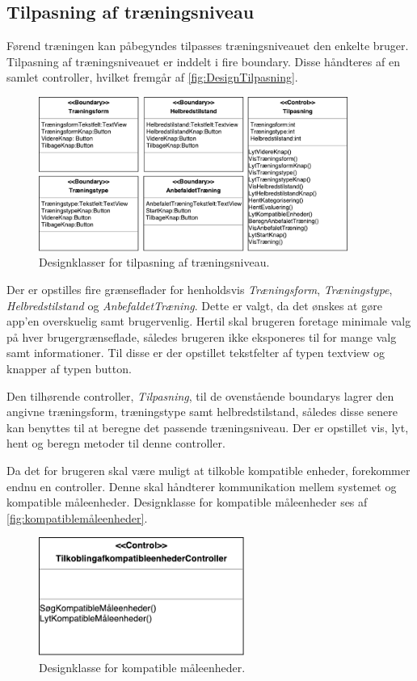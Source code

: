 \subsection*{Tilpasning af træningsniveau}
Førend træningen kan påbegyndes tilpasses træningsniveauet den enkelte bruger. Tilpasning af træningsniveauet er inddelt i fire boundary. Disse håndteres af en samlet controller, hvilket fremgår af \autoref{fig:DesignTilpasning}.

\begin{figure} [H]
\centering
\includegraphics[width=0.9\textwidth]{figures/MVC/MVCTilpasning}
\caption{Designklasser for tilpasning af træningsniveau.}
\label{fig:DesignTilpasning}
\end{figure}

\noindent
Der er opstilles fire grænseflader for henholdsvis \textit{Træningsform}, \textit{Træningstype}, \textit{Helbredstilstand} og \textit{AnbefaldetTræning}. Dette er valgt, da det ønskes at gøre app’en overskuelig samt brugervenlig. Hertil skal brugeren foretage minimale valg på hver brugergrænseflade, således brugeren ikke eksponeres til for mange valg samt informationer. Til disse er der opstillet tekstfelter af typen textview og knapper af typen button.   

Den tilhørende controller, \textit{Tilpasning}, til de ovenstående boundarys lagrer den angivne træningsform, træningstype samt helbredstilstand, således disse senere kan benyttes til at beregne det passende træningsniveau. Der er opstillet vis, lyt, hent og beregn metoder til denne controller. 

Da det for brugeren skal være muligt at tilkoble kompatible enheder, forekommer endnu en controller. Denne skal håndterer kommunikation mellem systemet og kompatible måleenheder. Designklasse for kompatible måleenheder ses af \autoref{fig:kompatiblemåleenheder}.

\begin{figure} [H]
\centering
\includegraphics[width=0.6\textwidth]{figures/MVC/MVCKompMaale}
\caption{Designklasse for kompatible måleenheder.}
\label{fig:kompatiblemåleenheder}
\end{figure}

